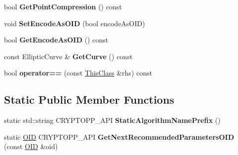 \begin{DoxyCompactItemize}
\item 
\hypertarget{class_d_l___group_parameters___e_c_afd42ddd8fd5765247d97c244b7ed55c8}{
bool {\bfseries GetPointCompression} () const }
\label{class_d_l___group_parameters___e_c_afd42ddd8fd5765247d97c244b7ed55c8}

\item 
\hypertarget{class_d_l___group_parameters___e_c_af700b6b9ae38e3910836971653f616db}{
void {\bfseries SetEncodeAsOID} (bool encodeAsOID)}
\label{class_d_l___group_parameters___e_c_af700b6b9ae38e3910836971653f616db}

\item 
\hypertarget{class_d_l___group_parameters___e_c_a7e42ad6eec2eacefaeff07e9d1c11275}{
bool {\bfseries GetEncodeAsOID} () const }
\label{class_d_l___group_parameters___e_c_a7e42ad6eec2eacefaeff07e9d1c11275}

\item 
\hypertarget{class_d_l___group_parameters___e_c_a170c03724e7540f8e41b960cf579ddd0}{
const EllipticCurve \& {\bfseries GetCurve} () const }
\label{class_d_l___group_parameters___e_c_a170c03724e7540f8e41b960cf579ddd0}

\item 
\hypertarget{class_d_l___group_parameters___e_c_acb62f08de7d25cd3031b61800f72cb6d}{
bool {\bfseries operator==} (const \hyperlink{class_d_l___group_parameters___e_c}{ThisClass} \&rhs) const }
\label{class_d_l___group_parameters___e_c_acb62f08de7d25cd3031b61800f72cb6d}

\end{DoxyCompactItemize}
\subsection*{Static Public Member Functions}
\begin{DoxyCompactItemize}
\item 
\hypertarget{class_d_l___group_parameters___e_c_a2bbc5a1c5cb867c1d072c1d8a5b8dbcf}{
static std::string CRYPTOPP\_\-API {\bfseries StaticAlgorithmNamePrefix} ()}
\label{class_d_l___group_parameters___e_c_a2bbc5a1c5cb867c1d072c1d8a5b8dbcf}

\item 
\hypertarget{class_d_l___group_parameters___e_c_ad0732f7a6747b66be3fc20a879cc361c}{
static \hyperlink{class_o_i_d}{OID} CRYPTOPP\_\-API {\bfseries GetNextRecommendedParametersOID} (const \hyperlink{class_o_i_d}{OID} \&oid)}
\label{class_d_l___group_parameters___e_c_ad0732f7a6747b66be3fc20a879cc361c}

\end{DoxyCompactItemize}
